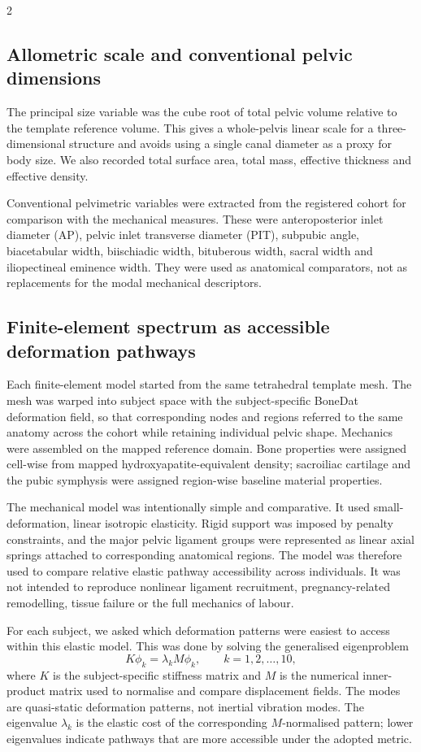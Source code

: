 \documentclass[openacc]{rsproca_new}
\begin{document}
\begin{multicols}{2}
\subsection{Allometric scale and conventional pelvic dimensions}

The principal size variable was the cube root of total pelvic volume relative to the template reference volume. This gives a whole-pelvis linear scale for a three-dimensional structure and avoids using a single canal diameter as a proxy for body size. We also recorded total surface area, total mass, effective thickness and effective density.

Conventional pelvimetric variables were extracted from the registered cohort for comparison with the mechanical measures. These were anteroposterior inlet diameter (AP), pelvic inlet transverse diameter (PIT), subpubic angle, biacetabular width, biischiadic width, bituberous width, sacral width and iliopectineal eminence width. They were used as anatomical comparators, not as replacements for the modal mechanical descriptors.

\subsection{Finite-element spectrum as accessible deformation pathways}

Each finite-element model started from the same tetrahedral template mesh. The mesh was warped into subject space with the subject-specific BoneDat deformation field, so that corresponding nodes and regions referred to the same anatomy across the cohort while retaining individual pelvic shape. Mechanics were assembled on the mapped reference domain. Bone properties were assigned cell-wise from mapped hydroxyapatite-equivalent density; sacroiliac cartilage and the pubic symphysis were assigned region-wise baseline material properties.

The mechanical model was intentionally simple and comparative. It used small-deformation, linear isotropic elasticity. Rigid support was imposed by penalty constraints, and the major pelvic ligament groups were represented as linear axial springs attached to corresponding anatomical regions. The model was therefore used to compare relative elastic pathway accessibility across individuals. It was not intended to reproduce nonlinear ligament recruitment, pregnancy-related remodelling, tissue failure or the full mechanics of labour.

For each subject, we asked which deformation patterns were easiest to access within this elastic model. This was done by solving the generalised eigenproblem
\begin{equation}
K\phi_{k} = \lambda_{k} M\phi_{k}, \qquad k=1,2,\ldots,10,
\end{equation}
where $K$ is the subject-specific stiffness matrix and $M$ is the numerical inner-product matrix used to normalise and compare displacement fields. The modes are quasi-static deformation patterns, not inertial vibration modes. The eigenvalue $\lambda_k$ is the elastic cost of the corresponding $M$-normalised pattern; lower eigenvalues indicate pathways that are more accessible under the adopted metric.


\end{multicols}
\end{document}
